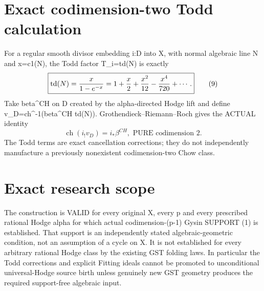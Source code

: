 \documentclass[11pt]{article}
\begin{document}
\section{Exact codimension-two Todd calculation}
For a regular smooth divisor embedding i:D into X, with normal algebraic line N and x=c1(N), the Todd factor T_i=td(N) is exactly
\[
 \boxed{\operatorname{td}(N)
      ={x\over1-e^{-x}}
       =1+\frac x2+\frac{x^2}{12}
          -\frac{x^4}{720}+\cdots.}             \tag{9}
\]
Take beta^CH on D created by the alpha-directed Hodge lift and define v_D=ch^{-1}(beta^CH td(N)). Grothendieck--Riemann--Roch gives the ACTUAL identity
\[
 \boxed{\operatorname{ch}(i_!v_D)=i_*\beta^{CH},
              \text{ PURE codimension }2.}     \tag{10}
\]
The Todd terms are exact cancellation corrections; they do not independently manufacture a previously nonexistent codimension-two Chow class.

\section{Exact research scope}
The construction is VALID for every original X, every p and every prescribed rational Hodge alpha for which actual codimension-(p-1) Gysin SUPPORT (1) is established. That support is an independently stated algebraic-geometric condition, not an assumption of a cycle on X. It is not established for every arbitrary rational Hodge class by the existing GST folding laws. In particular the Todd corrections and explicit Fitting ideals cannot be promoted to unconditional universal-Hodge source birth unless genuinely new GST geometry produces the required support-free algebraic input.
\end{document}
